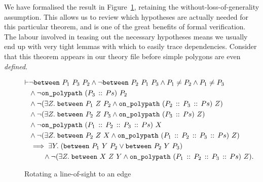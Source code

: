 We have formalised the result in Figure~\ref{fig:RotateToEdge}, retaining the without-loss-of-generality assumption. This allows us to review which hypotheses are actually needed for this particular theorem, and is one of the great benefits of formal verification. The labour involved in teasing out the necessary hypotheses means we usually end up with very tight lemmas with which to easily trace dependencies. Consider that this theorem appears in our theory file before simple polygons are even \emph{defined}.

\begin{figure}
\begin{equation}\label{eq:RotateToEdge}
  \begin{split}
\vdash&\neg\texttt{between}\ P_1\ P_3\ P_2 \wedge \neg\texttt{between}\ P_2\ P_1\ P_3 \wedge P_1 \neq P_2 \wedge P_1 \neq P_3\\
    &\wedge\neg\texttt{on\_polypath}\ (P_3\,::\,Ps)\ P_2\\
    &\wedge\neg(\exists Z.\; \texttt{between}\ P_1\ Z\ P_2 \wedge \texttt{on\_polypath}\ (P_2\,::\,P_3\,::\,Ps)\ Z)\\
    &\wedge\neg(\exists Z.\; \texttt{between}\ P_2\ Z\ P_3 \wedge \texttt{on\_polypath}\ (P_3\,::\,Ps)\ Z)\\
    &\wedge\neg\texttt{on\_polypath}\ (P_1\,::\,P_2\,::\,P_3\,::\,Ps)\ X\\
    &\wedge\neg(\exists Z.\; \texttt{between}\ P_2\ Z\ X \wedge \texttt{on\_polypath}\ (P_1\,::\,P_2\,::\,P_3\,::\,Ps)\ Z)\\
    &\implies\exists Y.\; (\texttt{between}\ P_1\ Y\ P_2 \vee \texttt{between}\ P_2\ Y\ P_3)\\
    &\qquad \wedge \neg(\exists Z.\; \texttt{between}\ X\ Z\ Y \wedge \texttt{on\_polypath}\ (P_1\,::\,P_2\,::\,P_3\,::\,Ps)\ Z).
  \end{split}
\end{equation}
\caption{Rotating a line-of-sight to an edge}
\label{fig:RotateToEdge}
\end{figure}

